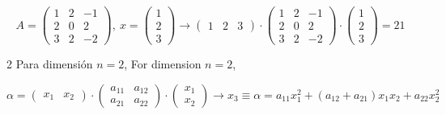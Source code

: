 \begin{equation*}
A=\begin{pmatrix}
1& 2& -1\\
2& 0& 2\\
3& 2& -2
\end{pmatrix}, \ x=\begin{pmatrix}
1\\
2\\
3
\end{pmatrix} \rightarrow \begin{pmatrix}
1& 2& 3
\end{pmatrix} \cdot \begin{pmatrix}
1& 2& -1\\
2& 0& 2\\
3& 2& -2
\end{pmatrix} \cdot \begin{pmatrix}
1\\
2\\
3
\end{pmatrix}= 21
\end{equation*}
\begin{paracol}{2}
Para dimensión $n=2$,
\switchcolumn
For dimension $n=2$,
\end{paracol}
\begin{equation*}
\alpha =\begin{pmatrix}
x_1& x_2
\end{pmatrix}\cdot \begin{pmatrix}
a_{11}& a_{12}\\
a_{21}& a_{22}
\end{pmatrix}\cdot \begin{pmatrix}
x_1\\
x_2
\end{pmatrix} \rightarrow x_3\equiv \alpha=a_{11}x_1^2+(a_{12}+a_{21})x_1x_2+a_{22}x_2^2
\end{equation*}

